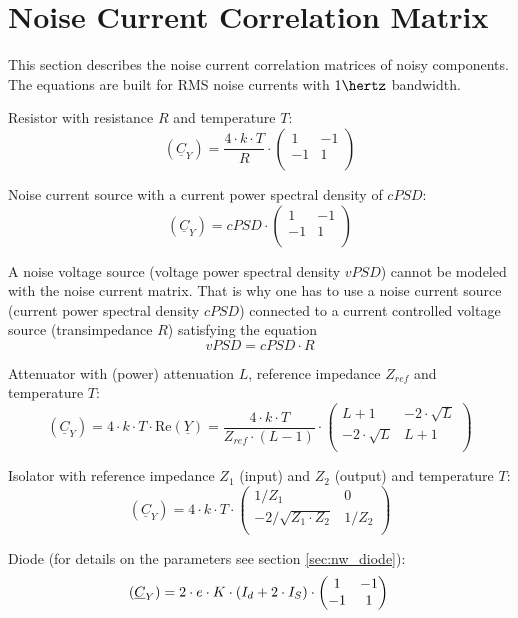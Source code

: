 \section{Noise Current Correlation Matrix}

This section describes the noise current correlation matrices of noisy
components.  The equations are built for RMS noise currents with
$1\hertz$ bandwidth.

\addvspace{12pt}

Resistor with resistance $R$ and temperature $T$:
\begin{equation}
(\underline{C}_Y) = \frac{4\cdot k\cdot T}{R} \cdot
\begin{pmatrix}
 1 & -1 \\
-1 &  1 \\
\end{pmatrix}
\end{equation}

Noise current source with a current power spectral density of $cPSD$:
\begin{equation}
(\underline{C}_Y) = cPSD \cdot
\begin{pmatrix}
 1 & -1 \\
-1 &  1 \\
\end{pmatrix}
\end{equation}

A noise voltage source (voltage power spectral density $vPSD$) cannot
be modeled with the noise current matrix.  That is why one has to use
a noise current source (current power spectral density $cPSD$)
connected to a current controlled voltage source (transimpedance $R$)
satisfying the equation
\begin{equation}
vPSD = cPSD \cdot R
\end{equation}

Attenuator with (power) attenuation $L$, reference impedance $Z_{ref}$
and temperature $T$:
\begin{equation}
(\underline{C}_Y) = 4\cdot k\cdot T\cdot \text{Re}\left(\underline{Y}\right)
 = \frac{4\cdot k\cdot T}{Z_{ref}\cdot (L-1)} \cdot
\begin{pmatrix}
 L+1            & -2\cdot\sqrt{L} \\
-2\cdot\sqrt{L} &  L+1 \\
\end{pmatrix}
\end{equation}

Isolator with reference impedance $Z_1$ (input) and $Z_2$ (output) and
temperature $T$:
\begin{equation}
(\underline{C}_Y) = 4\cdot k\cdot T\cdot
\begin{pmatrix}
 1/Z_1                 & 0 \\
-2/\sqrt{Z_1\cdot Z_2} &  1/Z_2 \\
\end{pmatrix}
\end{equation}

Diode (for details on the parameters see section \ref{sec:nw_diode}):
\begin{equation}
(\underline{C}_Y)
 = 2\cdot e\cdot K\cdot \left(I_{d} + 2\cdot I_{S}\right)\cdot
\begin{pmatrix}
   1 & -1\\
  -1 &  1\\
\end{pmatrix}\\
\end{equation}
